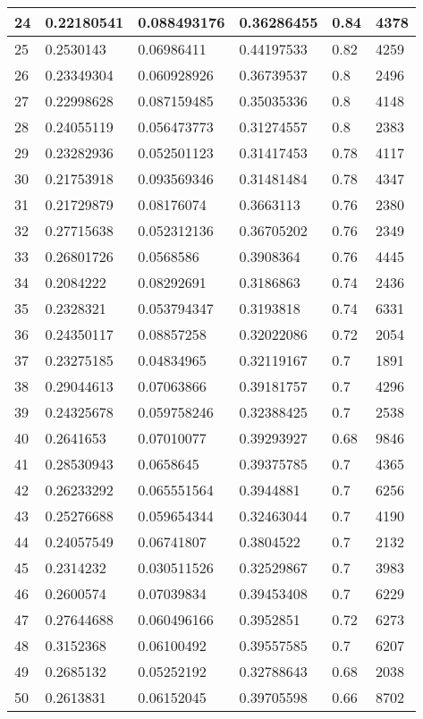 \begin{longtable}{|l|l|l|l|l|l|}
24 & 0.22180541 & 0.088493176 & 0.36286455 & 0.84 & 4378 \\ \hline 
25 & 0.2530143 & 0.06986411 & 0.44197533 & 0.82 & 4259 \\ \hline 
26 & 0.23349304 & 0.060928926 & 0.36739537 & 0.8 & 2496 \\ \hline 
27 & 0.22998628 & 0.087159485 & 0.35035336 & 0.8 & 4148 \\ \hline 
28 & 0.24055119 & 0.056473773 & 0.31274557 & 0.8 & 2383 \\ \hline 
29 & 0.23282936 & 0.052501123 & 0.31417453 & 0.78 & 4117 \\ \hline 
30 & 0.21753918 & 0.093569346 & 0.31481484 & 0.78 & 4347 \\ \hline 
31 & 0.21729879 & 0.08176074 & 0.3663113 & 0.76 & 2380 \\ \hline 
32 & 0.27715638 & 0.052312136 & 0.36705202 & 0.76 & 2349 \\ \hline 
33 & 0.26801726 & 0.0568586 & 0.3908364 & 0.76 & 4445 \\ \hline 
34 & 0.2084222 & 0.08292691 & 0.3186863 & 0.74 & 2436 \\ \hline 
35 & 0.2328321 & 0.053794347 & 0.3193818 & 0.74 & 6331 \\ \hline 
36 & 0.24350117 & 0.08857258 & 0.32022086 & 0.72 & 2054 \\ \hline 
37 & 0.23275185 & 0.04834965 & 0.32119167 & 0.7 & 1891 \\ \hline 
38 & 0.29044613 & 0.07063866 & 0.39181757 & 0.7 & 4296 \\ \hline 
39 & 0.24325678 & 0.059758246 & 0.32388425 & 0.7 & 2538 \\ \hline 
40 & 0.2641653 & 0.07010077 & 0.39293927 & 0.68 & 9846 \\ \hline 
41 & 0.28530943 & 0.0658645 & 0.39375785 & 0.7 & 4365 \\ \hline 
42 & 0.26233292 & 0.065551564 & 0.3944881 & 0.7 & 6256 \\ \hline 
43 & 0.25276688 & 0.059654344 & 0.32463044 & 0.7 & 4190 \\ \hline 
44 & 0.24057549 & 0.06741807 & 0.3804522 & 0.7 & 2132 \\ \hline 
45 & 0.2314232 & 0.030511526 & 0.32529867 & 0.7 & 3983 \\ \hline 
46 & 0.2600574 & 0.07039834 & 0.39453408 & 0.7 & 6229 \\ \hline 
47 & 0.27644688 & 0.060496166 & 0.3952851 & 0.72 & 6273 \\ \hline 
48 & 0.3152368 & 0.06100492 & 0.39557585 & 0.7 & 6207 \\ \hline 
49 & 0.2685132 & 0.05252192 & 0.32788643 & 0.68 & 2038 \\ \hline 
50 & 0.2613831 & 0.06152045 & 0.39705598 & 0.66 & 8702 \\ \hline 
\end{longtable}